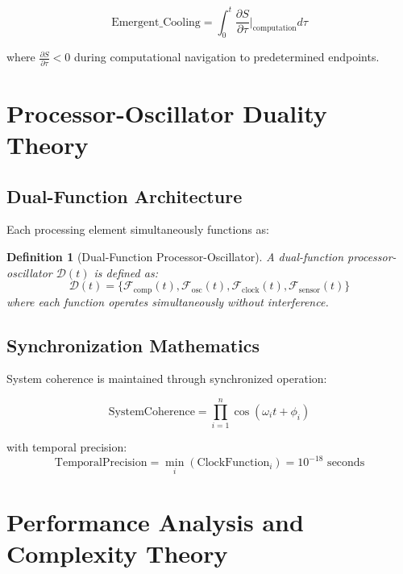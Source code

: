 \documentclass[12pt,a4paper]{article}
\newtheorem{definition}{Definition}
\begin{document}
\begin{equation}
\text{Emergent\_Cooling} = \int_0^t \frac{\partial S}{\partial \tau} \bigg|_{\text{computation}} d\tau
\end{equation}

where $\frac{\partial S}{\partial \tau} < 0$ during computational navigation to predetermined endpoints.

\section{Processor-Oscillator Duality Theory}

\subsection{Dual-Function Architecture}

Each processing element simultaneously functions as:

\begin{definition}[Dual-Function Processor-Oscillator]
A dual-function processor-oscillator $\mathcal{D}(t)$ is defined as:
\begin{equation}
\mathcal{D}(t) = \{\mathcal{F}_{\text{comp}}(t), \mathcal{F}_{\text{osc}}(t), \mathcal{F}_{\text{clock}}(t), \mathcal{F}_{\text{sensor}}(t)\}
\end{equation}
where each function operates simultaneously without interference.
\end{definition}

\subsection{Synchronization Mathematics}

System coherence is maintained through synchronized operation:

\begin{equation}
\text{SystemCoherence} = \prod_{i=1}^{n} \cos(\omega_i t + \phi_i)
\end{equation}

with temporal precision:
\begin{equation}
\text{TemporalPrecision} = \min_i(\text{ClockFunction}_i) = 10^{-18} \text{ seconds}
\end{equation}

\section{Performance Analysis and Complexity Theory}
\end{document}
